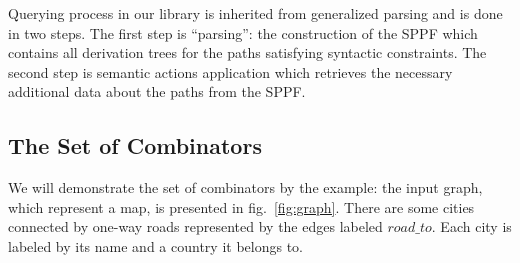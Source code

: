 
Querying process in our library is inherited from generalized parsing and is done in two steps.
The first step is ``parsing'': the construction of the SPPF which contains all derivation trees for the paths satisfying syntactic constraints.
The second step is semantic actions application which retrieves the necessary additional data about the paths from the SPPF.

\subsection{The Set of Combinators}

We will demonstrate the set of combinators by the example: the input graph, which represent a map, is presented in fig.~\ref{fig:graph}.
There are some cities connected by one-way roads represented by the edges labeled $road\_to$.
Each city is labeled by its name and a country it belongs to.

